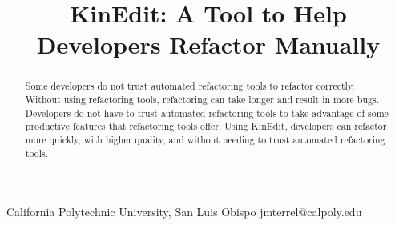 \documentclass{sigplanconf}
\begin{document}
\setlength{\pdfpageheight}{\paperheight}
\setlength{\pdfpagewidth}{\paperwidth}




\permissiontopublish             %


\newcommand{\pname}{KinEdit}

\title{\pname{}: A Tool to Help Developers Refactor Manually}

           {California Polytechnic University, San Luis Obispo}
           {jmterrel@calpoly.edu}

\maketitle

\begin{abstract}
Some developers do not trust automated refactoring tools to refactor correctly.
Without using refactoring tools, refactoring can take longer and result
in more bugs. Developers do not have to trust automated refactoring tools to
take advantage of some productive features that refactoring tools offer.
Using \pname{}, developers can refactor more quickly, with higher
quality, and without needing to trust automated refactoring tools.
\end{abstract}


\end{document}
